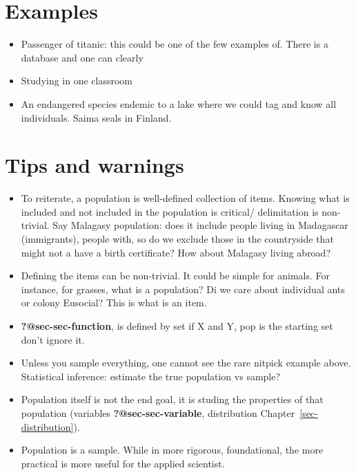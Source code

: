 \documentclass[
  letterpaper,
  DIV=11,
  numbers=noendperiod]{scrreprt}
\providecommand{\tightlist}{%
  \setlength{\itemsep}{0pt}\setlength{\parskip}{0pt}}
\begin{document}
\section*{Examples}\label{examples-13}


\begin{itemize}
\tightlist
\item
  Passenger of titanic: this could be one of the few examples of. There
  is a database and one can clearly
\item
  Studying in one classroom
\item
  An endangered species endemic to a lake where we could tag and know
  all individuals. Saima seals in Finland.
\end{itemize}

\section*{Tips and warnings}\label{tips-and-warnings-7}


\begin{itemize}
\tightlist
\item
  To reiterate, a population is well-defined collection of items.
  Knowing what is included and not included in the population is
  critical/ delimitation is non-trivial. Say Malagasy population: does
  it include people living in Madagascar (immigrants), people with, so
  do we exclude those in the countryside that might not a have a birth
  certificate? How about Malagasy living abroad?
\item
  Defining the items can be non-trivial. It could be simple for animals.
  For instance, for grasses, what is a population? Di we care about
  individual ants or colony Eusocial? This is what is an item.
\item
  \textbf{?@sec-sec-function}, is defined by set if X and Y, pop is the
  starting set don't ignore it.
\item
  Unless you sample everything, one cannot see the rare nitpick example
  above. Statistical inference: estimate the true population vs sample?
\item
  Population itself is not the end goal, it is studing the properties of
  that population (variables \textbf{?@sec-sec-variable}, distribution
  Chapter~\ref{sec-distribution}).
\item
  Population is a sample. While in more rigorous, foundational, the more
  practical is more useful for the applied scientist.
\end{itemize}
\end{document}

